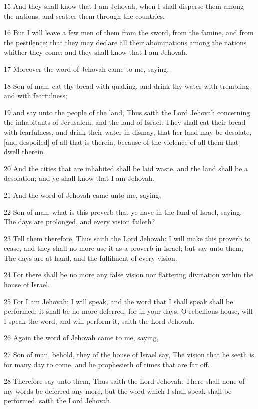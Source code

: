 \par 15 And they shall know that I am Jehovah, when I shall disperse them among the nations, and scatter them through the countries.
\par 16 But I will leave a few men of them from the sword, from the famine, and from the pestilence; that they may declare all their abominations among the nations whither they come; and they shall know that I am Jehovah.
\par 17 Moreover the word of Jehovah came to me, saying,
\par 18 Son of man, eat thy bread with quaking, and drink thy water with trembling and with fearfulness;
\par 19 and say unto the people of the land, Thus saith the Lord Jehovah concerning the inhabitants of Jerusalem, and the land of Israel: They shall eat their bread with fearfulness, and drink their water in dismay, that her land may be desolate, [and despoiled] of all that is therein, because of the violence of all them that dwell therein.
\par 20 And the cities that are inhabited shall be laid waste, and the land shall be a desolation; and ye shall know that I am Jehovah.
\par 21 And the word of Jehovah came unto me, saying,
\par 22 Son of man, what is this proverb that ye have in the land of Israel, saying, The days are prolonged, and every vision faileth?
\par 23 Tell them therefore, Thus saith the Lord Jehovah: I will make this proverb to cease, and they shall no more use it as a proverb in Israel; but say unto them, The days are at hand, and the fulfilment of every vision.
\par 24 For there shall be no more any false vision nor flattering divination within the house of Israel.
\par 25 For I am Jehovah; I will speak, and the word that I shall speak shall be performed; it shall be no more deferred: for in your days, O rebellious house, will I speak the word, and will perform it, saith the Lord Jehovah.
\par 26 Again the word of Jehovah came to me, saying,
\par 27 Son of man, behold, they of the house of Israel say, The vision that he seeth is for many day to come, and he prophesieth of times that are far off.
\par 28 Therefore say unto them, Thus saith the Lord Jehovah: There shall none of my words be deferred any more, but the word which I shall speak shall be performed, saith the Lord Jehovah.

